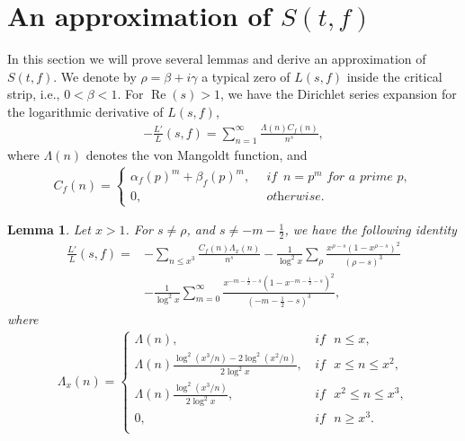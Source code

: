\documentclass[11pt,reqno]{amsart}
\newcommand{\bea}{\begin{eqnarray}}
\newcommand{\eea}{\end{eqnarray}}
\newcommand{\bna}{\begin{eqnarray*}}
\newcommand{\ena}{\end{eqnarray*}}
\numberwithin{equation}{section}
\theoremstyle{plain}
\newtheorem{lemma}{Lemma}[section]
\theoremstyle{definition}
\renewcommand{\Re}{\operatorname{Re}}
\begin{document}
\section{An approximation of $S(t,f)$}
In this section we will prove several lemmas and derive an approximation of $S(t,f)$.
We denote by $\rho=\beta+i\gamma$ a typical zero of $L(s,f)$ inside the critical strip, i.e., $0<\beta<1$.
For $\Re(s)>1$, we have the Dirichlet series expansion for the logarithmic derivative of $L(s,f)$,
\bea\label{Log derivative definition}
-\frac{L'}{L}(s,f)=\sum_{n=1}^\infty \frac{\Lambda(n)C_f(n)}{n^s},
\eea
where $\Lambda(n)$ denotes the von Mangoldt function, and
\bea\label{Log derivative coefficient}
C_f(n)=\begin{cases}
\alpha_f(p)^m+\beta_f(p)^m, \,&\textit{ if }\, n=p^m\,\, \textit{for a prime}\,\,p,\\
0, \,& \textit{ otherwise}.
\end{cases}
\eea
\begin{lemma}\label{lemma 1}
Let $x>1$. For $s\neq \rho$, and $s\neq -m-\frac{1}{2}$, we have the following identity
\begin{equation*}
\begin{split}
\frac{L'}{L}(s,f)=&-\sum_{n\leq x^3} \frac{C_f(n)\Lambda_x(n)}{n^s}
-\frac{1}{\log^2x}\sum_\rho\frac{x^{\rho-s}(1-x^{\rho-s})^2}{(\rho-s)^3}\\
&-\frac{1}{\log^2x}\sum_{m=0}^\infty\frac{x^{-m-\frac{1}{2}-s}(1-x^{-m-\frac{1}{2}-s})^2}{(-m-\frac{1}{2}-s)^3},
\end{split}
\end{equation*}
where
\bna
\Lambda_x(n)=\begin{cases}
\Lambda(n), \,&\textit{if }\,\,n\leq x,\\
\Lambda(n)\frac{\log^2(x^3/n)-2\log^2(x^2/n)}{2\log^2x}, \,& \textit{if }\,\,x\leq n\leq x^2,\\
\Lambda(n)\frac{\log^2(x^3/n)}{2\log^2x}, \,& \textit{if }\,\,x^2\leq n\leq x^3,\\
0, \,& \textit{if }\,\,n\geq x^3.\\
\end{cases}
\ena
\end{lemma}
\end{document}
